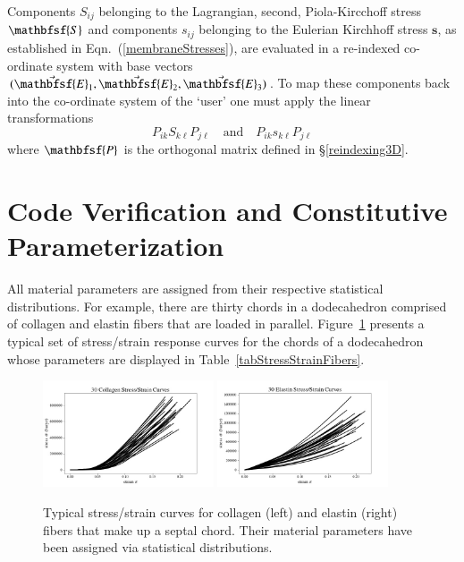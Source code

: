 Components $S_{ij}$ belonging to the Lagrangian, second, Piola-Kircchoff stress $\mathbfsf{S}$ and components $s_{ij}$ belonging to the Eulerian Kirchhoff stress $\boldsymbol{s}$, as established in Eqn.~(\ref{membraneStresses}), are evaluated in a re-indexed co-ordinate system with base vectors $( \vec{\mathbfsf{E}}_1 , \vec{\mathbfsf{E}}_2 , \vec{\mathbfsf{E}}_3 )$.  To map these components back into the co-ordinate system of the `user' one must apply the linear transformations
\begin{displaymath}
P_{ik} S_{k\ell} P_{j\ell}
\quad \text{and} \quad
P_{ik} s_{k\ell} P_{j\ell} 
\end{displaymath}
where $\mathbfsf{P}$ is the orthogonal matrix defined in \S\ref{reindexing3D}.

\section{Code Verification and Constitutive Parameterization}
\label{secCE_verifyCode}

All material parameters are assigned from their respective statistical distributions.  For example, there are thirty chords in a dodecahedron comprised of collagen and elastin fibers that are loaded in parallel.  Figure~\ref{figStressStrainFibers} presents a typical set of stress\slash strain response curves for the chords of a dodecahedron whose parameters are displayed in Table~\ref{tabStressStrainFibers}.

\begin{figure}
    \centering
    \includegraphics[width=0.45\textwidth]{figures/collagenStressStrain.jpg}
    \includegraphics[width=0.45\textwidth]{figures/elastinStressStrain.jpg}
    \caption{Typical stress\slash strain curves for collagen (left) and elastin (right) fibers that make up a septal chord.  Their material parameters have been assigned via statistical distributions.}
    \label{figStressStrainFibers}
\end{figure}

